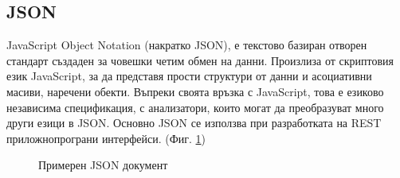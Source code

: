 \subsection{JSON}
JavaScript Object Notation (накратко JSON), е текстово базиран отворен стандарт създаден за човешки четим обмен на данни. Произлиза от скриптовия език JavaScript, за да представя прости структури от данни и асоциативни масиви, наречени обекти. Въпреки своята връзка с JavaScript, това е езиково независима спецификация, с анализатори, които могат да преобразуват много други езици в JSON. Основно JSON се използва при разработката на REST приложнопрограни интерфейси. (Фиг. \ref{fig:example-json})

\begin{figure}[H]
    
    \centering
    \caption{Примерен JSON документ}
    \label{fig:example-json}
\end{figure}
